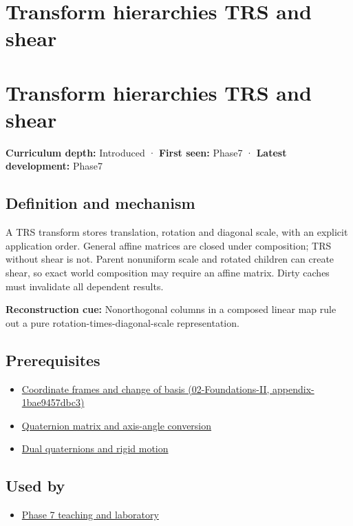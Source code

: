 \hypertarget{appendix-292c061cd47c}{}
\section*{Transform hierarchies TRS and shear}
\section{Transform hierarchies TRS and shear}\label{transform-hierarchies-trs-and-shear}

\textbf{Curriculum depth:} Introduced · \textbf{First seen:} Phase7 · \textbf{Latest development:} Phase7

\subsection{Definition and mechanism}\label{definition-and-mechanism}

A TRS transform stores translation, rotation and diagonal scale, with an explicit application order. General affine matrices are closed under composition; TRS without shear is not. Parent nonuniform scale and rotated children can create shear, so exact world composition may require an affine matrix. Dirty caches must invalidate all dependent results.

\textbf{Reconstruction cue:} Nonorthogonal columns in a composed linear map rule out a pure rotation-times-diagonal-scale representation.

\subsection{Prerequisites}\label{prerequisites}

\begin{itemize}
\tightlist
\item
  \href{}{Coordinate frames and change of basis (02-Foundations-II, appendix-1bae9457dbc3)}
\item
  \hyperref[appendix-26d8da71f6c4]{Quaternion matrix and axis-angle conversion}
\item
  \hyperref[appendix-d1ea57347893]{Dual quaternions and rigid motion}
\end{itemize}

\subsection{Used by}\label{used-by}

\begin{itemize}
\tightlist
\item
  \href{Continuous\%20Notes/Computing\%20Foundations\%20-\%20From\%20Bits\%20to\%20C++\%20and\%20Systems\%20APIs\#Keep\%20the\%20promises\%20visible\%20while\%20moving\%20between\%20representations}{Phase 7 teaching and laboratory}
\end{itemize}

